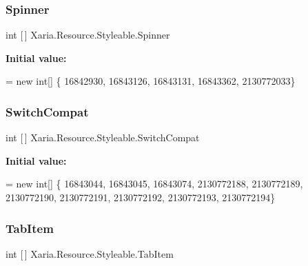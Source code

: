 \subsubsection{\texorpdfstring{Spinner}{Spinner}}
{\footnotesize\ttfamily int \mbox{[}$\,$\mbox{]} Xaria.\+Resource.\+Styleable.\+Spinner\hspace{0.3cm}{\ttfamily [static]}}

{\bfseries Initial value\+:}
\begin{DoxyCode}
= \textcolor{keyword}{new} \textcolor{keywordtype}{int}[] \{
                    16842930,
                    16843126,
                    16843131,
                    16843362,
                    2130772033\}
\end{DoxyCode}
\mbox{\label{classXaria_1_1Resource_1_1Styleable_a5ee60cf698134751c3a5948d6eedfb0c}} 
\subsubsection{\texorpdfstring{Switch\+Compat}{SwitchCompat}}
{\footnotesize\ttfamily int \mbox{[}$\,$\mbox{]} Xaria.\+Resource.\+Styleable.\+Switch\+Compat\hspace{0.3cm}{\ttfamily [static]}}

{\bfseries Initial value\+:}
\begin{DoxyCode}
= \textcolor{keyword}{new} \textcolor{keywordtype}{int}[] \{
                    16843044,
                    16843045,
                    16843074,
                    2130772188,
                    2130772189,
                    2130772190,
                    2130772191,
                    2130772192,
                    2130772193,
                    2130772194\}
\end{DoxyCode}
\mbox{\label{classXaria_1_1Resource_1_1Styleable_a483b2213f1ffc676cc1a1265ae691dda}} 
\subsubsection{\texorpdfstring{Tab\+Item}{TabItem}}
{\footnotesize\ttfamily int \mbox{[}$\,$\mbox{]} Xaria.\+Resource.\+Styleable.\+Tab\+Item\hspace{0.3cm}{\ttfamily [static]}}

